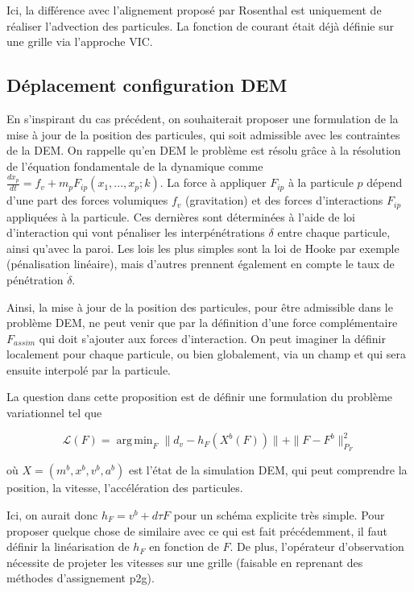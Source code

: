\documentclass{article}
\DeclareMathOperator*{\argmin}{arg\,min}
\begin{document}
Ici, la différence avec l'alignement proposé par Rosenthal est uniquement de réaliser l'advection des particules. La fonction de courant était déjà définie sur une grille via l'approche VIC.

\subsection{Déplacement configuration DEM}
En s'inspirant du cas précédent, on souhaiterait proposer une formulation de la mise à jour de la position des particules, qui soit admissible avec les contraintes de la DEM. On rappelle qu'en DEM le problème est résolu grâce à la résolution de l'équation fondamentale de la dynamique comme $\frac{dx_p}{dt} = f_v + m_p F_{ip}(x_1, ..., x_p ; k)$. La force à appliquer $F_{ip}$ à la particule $p$ dépend d'une part des forces volumiques $f_v$ (gravitation) et des forces d'interactions $F_{ip}$ appliquées à la particule. Ces dernières sont déterminées à l'aide de loi d'interaction qui vont pénaliser les interpénétrations $\delta$ entre chaque particule, ainsi qu'avec la paroi. Les lois les plus simples sont la loi de Hooke par exemple (pénalisation linéaire), mais d'autres prennent également en compte le taux de pénétration $\dot \delta$.

Ainsi, la mise à jour de la position des particules, pour être admissible dans le problème DEM, ne peut venir que par la définition d'une force complémentaire $F_{assim}$ qui doit s'ajouter aux forces d'interaction. On peut imaginer la définir localement pour chaque particule, ou bien globalement, via un champ et qui sera ensuite interpolé par la particule.

La question dans cette proposition est de définir une formulation du problème variationnel tel que

\begin{equation*}
    \mathcal{L}(F) = \argmin_{F} \|d_v - h_{F}(X^b(F))\| + \|F - F^b\|^2_{P_{F}}
\end{equation*}

où $X = (m^b, x^b, v^b, a^b)$ est l'état de la simulation DEM, qui peut comprendre la position, la vitesse, l'accélération des particules.

Ici, on aurait donc $h_F = v^b + d\tau F$ pour un schéma explicite très simple.
Pour proposer quelque chose de similaire avec ce qui est fait précédemment, il faut définir la linéarisation de $h_F$ en fonction de $F$. De plus, l'opérateur d'observation nécessite de projeter les vitesses sur une grille (faisable en reprenant des méthodes d'assignement p2g).
\end{document}
